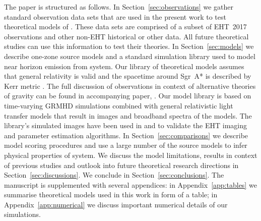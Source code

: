 The paper is structured as follows. In Section~\ref{sec:observations} we gather standard observation data sets that are used in the present work to test theoretical models of \sgra. These data sets are comprised of a subset of EHT~2017 observations and other non-EHT historical or other data. All future theoretical studies can use this information to test their theories. In Section~\ref{sec:models} we describe one-zone source models and a standard simulation library used to model near horizon emission from \sgra system. Our library of theoretical models assumes that general relativity is valid and the spacetime around Sgr~A* is described by Kerr metric \citep{1963PhRvL..11..237K}. The full discussion of \sgra observations in context of alternative theories of gravity can be found in accompanying paper, .
Our model library is based on time-varying GRMHD simulations combined with general relativistic light transfer models that result in images and broadband spectra of the models. The library's simulated images have been used in  and  to validate the \sgra EHT imaging and parameter estimation algorithms.
In Section~\ref{sec:comparisons} we describe model scoring procedures and use a large number of the source models to infer physical properties of \sgra system. We discuss the model limitations, results in context of previous studies and outlook into future \sgra theoretical research directions in Section~\ref{sec:discussions}. We conclude in Section~\ref{sec:conclusions}.
The manuscript is supplemented with several appendices: in Appendix~\ref{app:tables} we summarise theoretical models used in this work in form of a table; in Appendix~\ref{app:numerical} we discuss important numerical details of our simulations.


